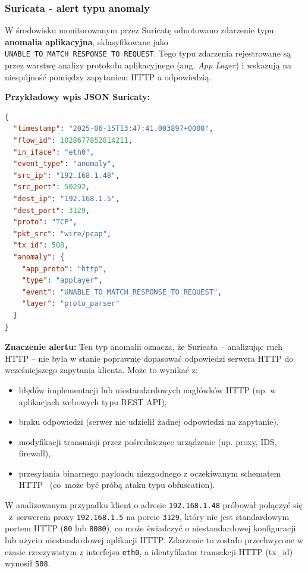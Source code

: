 \documentclass[
    left=2.5cm,         %
    right=2.5cm,        %
    top=2.5cm,          %
    bottom=3cm,         %
    bindingoffset=6mm,  %
    nohyphenation=true %
]{eiti/eiti-thesis} %
\begin{document}

\subsubsection{Suricata - alert typu anomaly}

W środowisku monitorowanym przez Suricatę odnotowano zdarzenie typu \textbf{anomalia aplikacyjna}, sklasyfikowane jako \texttt{UNABLE\_TO\_MATCH\_RESPONSE\_TO\_REQUEST}. Tego typu zdarzenia rejestrowane są przez warstwę analizy protokołu aplikacyjnego (ang. \textit{App Layer}) 
i wskazują na niespójność pomiędzy zapytaniem HTTP a odpowiedzią.

\textbf{Przykładowy wpis JSON Suricaty:}
\begin{lstlisting}[language=json, caption={Alert typu anomaly: UNABLE\_TO\_MATCH\_RESPONSE\_TO\_REQUEST}, label={lst:suricata-anomaly-mismatch}]
{
  "timestamp": "2025-06-15T13:47:41.003897+0000",
  "flow_id": 1028677852814211,
  "in_iface": "eth0",
  "event_type": "anomaly",
  "src_ip": "192.168.1.48",
  "src_port": 50292,
  "dest_ip": "192.168.1.5",
  "dest_port": 3129,
  "proto": "TCP",
  "pkt_src": "wire/pcap",
  "tx_id": 508,
  "anomaly": {
    "app_proto": "http",
    "type": "applayer",
    "event": "UNABLE_TO_MATCH_RESPONSE_TO_REQUEST",
    "layer": "proto_parser"
  }
}
\end{lstlisting}

\textbf{Znaczenie alertu:}
Ten typ anomalii oznacza, że Suricata – analizując ruch HTTP – nie była w stanie poprawnie dopasować odpowiedzi serwera HTTP do wcześniejszego zapytania klienta. 
Może to wynikać z:
\begin{itemize}
  \item błędów implementacji lub niestandardowych nagłówków HTTP (np. w aplikacjach webowych typu REST API),
  \item braku odpowiedzi (serwer nie udzielił żadnej odpowiedzi na zapytanie),
  \item modyfikacji transmisji przez pośredniczące urządzenie (np. proxy, IDS, firewall),
  \item przesyłania binarnego payloadu niezgodnego z oczekiwanym schematem HTTP ~(co~może być próbą ataku typu obfuscation).
\end{itemize}

W analizowanym przypadku klient o adresie \texttt{192.168.1.48} próbował połączyć się ~z~serwerem proxy \texttt{192.168.1.5} na porcie \texttt{3129}, który 
nie jest standardowym portem HTTP (\texttt{80} lub \texttt{8080}), co może świadczyć o niestandardowej konfiguracji lub użyciu niestandardowej aplikacji HTTP. Zdarzenie to zostało przechwycone w czasie rzeczywistym z interfejsu \texttt{eth0}, a identyfikator transakcji HTTP (tx\_id) wynosił \texttt{508}.
\end{document}
